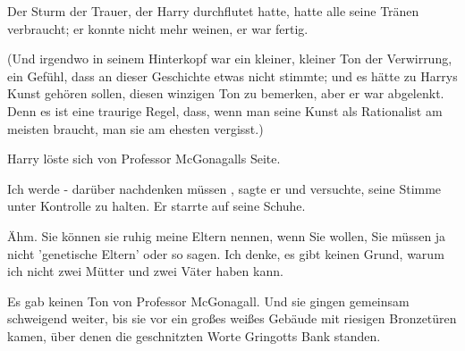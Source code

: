 Der Sturm
der Trauer, der Harry durchflutet hatte, hatte alle seine Tränen verbraucht; er konnte nicht mehr weinen, er war fertig.

(Und irgendwo in seinem Hinterkopf war ein kleiner, kleiner Ton der Verwirrung, ein Gefühl, dass an dieser
Geschichte etwas nicht stimmte; und es hätte zu Harrys Kunst gehören sollen, diesen winzigen Ton zu bemerken, aber er
war abgelenkt. Denn es ist eine traurige Regel, dass, wenn man seine Kunst als Rationalist am meisten braucht, man sie
am ehesten vergisst.)

Harry löste sich von Professor McGonagalls Seite.

\glqq Ich werde -
darüber nachdenken müssen\grqq{} , sagte er und versuchte, seine Stimme unter Kontrolle zu halten. Er starrte auf seine
Schuhe.

\glqq Ähm. Sie können sie ruhig meine Eltern nennen, wenn Sie wollen, Sie müssen ja nicht
'genetische Eltern' oder so sagen. Ich denke, es gibt keinen Grund, warum ich nicht zwei Mütter und zwei Väter haben
kann.\grqq{}

Es gab keinen Ton von Professor McGonagall. Und sie gingen gemeinsam schweigend weiter, bis sie
vor ein großes weißes Gebäude mit riesigen Bronzetüren kamen, über denen die geschnitzten Worte \glqq Gringotts
Bank\grqq{} standen.